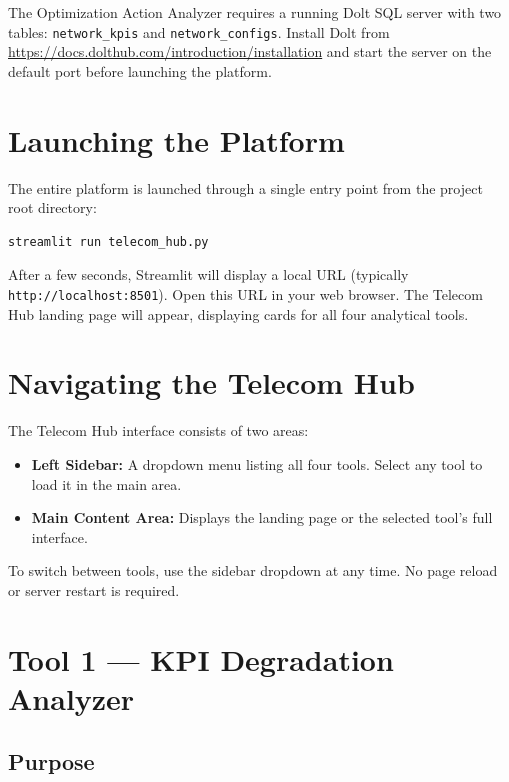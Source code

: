 The Optimization Action Analyzer requires a running Dolt SQL server with two tables: \texttt{network\_kpis} and \texttt{network\_configs}. Install Dolt from \url{https://docs.dolthub.com/introduction/installation} and start the server on the default port before launching the platform.

\section{Launching the Platform}

The entire platform is launched through a single entry point from the project root directory:

\begin{verbatim}
streamlit run telecom_hub.py
\end{verbatim}

After a few seconds, Streamlit will display a local URL (typically \texttt{http://localhost:8501}). Open this URL in your web browser. The Telecom Hub landing page will appear, displaying cards for all four analytical tools.

\section{Navigating the Telecom Hub}

The Telecom Hub interface consists of two areas:

\begin{itemize}
    \item \textbf{Left Sidebar:} A dropdown menu listing all four tools. Select any tool to load it in the main area.
    \item \textbf{Main Content Area:} Displays the landing page or the selected tool's full interface.
\end{itemize}

To switch between tools, use the sidebar dropdown at any time. No page reload or server restart is required.

\section{Tool 1 — KPI Degradation Analyzer}

\subsection{Purpose}

